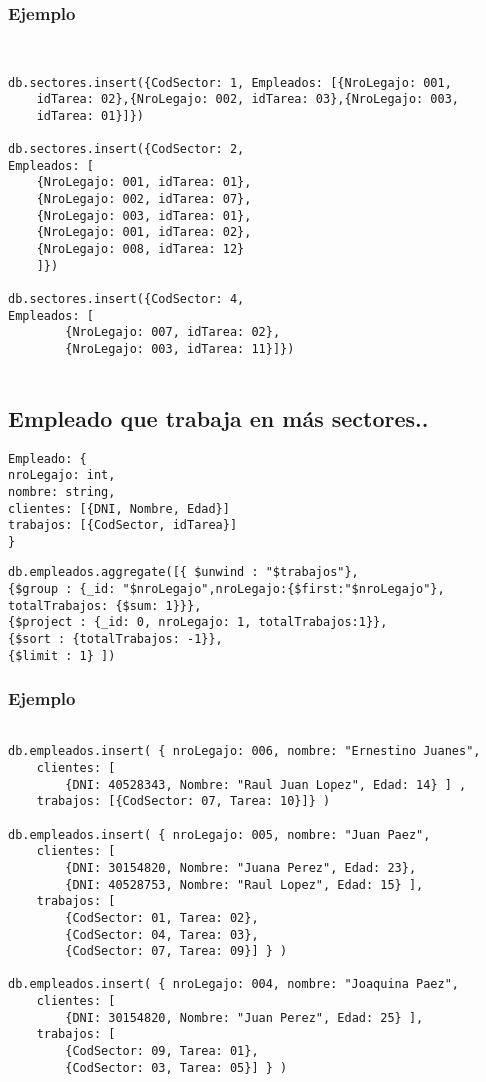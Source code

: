 \subsubsection{Ejemplo}
\begin{lstlisting}


db.sectores.insert({CodSector: 1, Empleados: [{NroLegajo: 001, 
	idTarea: 02},{NroLegajo: 002, idTarea: 03},{NroLegajo: 003, 
	idTarea: 01}]})

db.sectores.insert({CodSector: 2, 
Empleados: [
	{NroLegajo: 001, idTarea: 01},
	{NroLegajo: 002, idTarea: 07},
	{NroLegajo: 003, idTarea: 01},
	{NroLegajo: 001, idTarea: 02},
	{NroLegajo: 008, idTarea: 12}
	]})

db.sectores.insert({CodSector: 4, 
Empleados: [
		{NroLegajo: 007, idTarea: 02},	
		{NroLegajo: 003, idTarea: 11}]})


\end{lstlisting}

\subsection{Empleado que trabaja en más sectores..}

\begin{lstlisting}
Empleado: {
nroLegajo: int,
nombre: string,
clientes: [{DNI, Nombre, Edad}]
trabajos: [{CodSector, idTarea}]
}

\end{lstlisting}


\begin{lstlisting}
db.empleados.aggregate([{ $unwind : "$trabajos"}, 
{$group : {_id: "$nroLegajo",nroLegajo:{$first:"$nroLegajo"}, 
totalTrabajos: {$sum: 1}}},
{$project : {_id: 0, nroLegajo: 1, totalTrabajos:1}},
{$sort : {totalTrabajos: -1}},
{$limit : 1} ])
\end{lstlisting}

\subsubsection{Ejemplo}

\begin{lstlisting}

db.empleados.insert( { nroLegajo: 006, nombre: "Ernestino Juanes", 
	clientes: [ 
		{DNI: 40528343, Nombre: "Raul Juan Lopez", Edad: 14} ] , 
	trabajos: [{CodSector: 07, Tarea: 10}]} )

db.empleados.insert( { nroLegajo: 005, nombre: "Juan Paez", 
	clientes: [ 
		{DNI: 30154820, Nombre: "Juana Perez", Edad: 23}, 
		{DNI: 40528753, Nombre: "Raul Lopez", Edad: 15} ], 
	trabajos: [
		{CodSector: 01, Tarea: 02},
		{CodSector: 04, Tarea: 03},
		{CodSector: 07, Tarea: 09}] } )

db.empleados.insert( { nroLegajo: 004, nombre: "Joaquina Paez", 
	clientes: [ 
		{DNI: 30154820, Nombre: "Juan Perez", Edad: 25} ], 
	trabajos: [
		{CodSector: 09, Tarea: 01},
		{CodSector: 03, Tarea: 05}] } )

\end{lstlisting}


